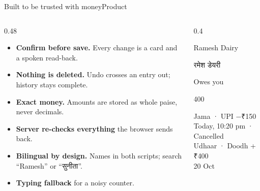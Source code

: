 \documentclass[aspectratio=169,10pt]{beamer}
\newcommand{\rs}{{\deva ₹}}
\newcommand{\lbl}[1]{{\color{muted}\footnotesize #1}}
\begin{document}
\begin{frame}{Built to be trusted with money}{Product}
  \begin{columns}[T]
    \begin{column}{0.48\textwidth}
      \begin{itemize}\setlength{\itemsep}{3pt}\small
        \item \textbf{Confirm before save.} Every change is a card and a spoken read-back.
        \item \textbf{Nothing is deleted.} Undo crosses an entry out; history stays complete.
        \item \textbf{Exact money.} Amounts are stored as whole paise, never decimals.
        \item \textbf{Server re-checks everything} the browser sends back.
        \item \textbf{Bilingual by design.} Names in both scripts; search “Ramesh” or “{\deva सुनीता}”.
        \item \textbf{Typing fallback} for a noisy counter.
      \end{itemize}
    \end{column}
    \begin{column}{0.4\textwidth}
      \begin{appcard}
        {\semibold Ramesh Dairy}\par{\color{muted}\deva रमेश डेयरी}\par\vspace{6pt}
        {\lbl{Owes you}}\par{\semibold\fontsize{24}{26}\selectfont\color{credit}\rs400}
      \end{appcard}
      \vspace{-4pt}
      \begin{appcard}
        \small
        Jama · UPI \hfill {\color{payment}\semibold −\rs150}\\[-1pt]
        {\scriptsize\color{muted} Today, 10:20 pm · Cancelled}\\[3pt]
        Udhaar · Doodh \hfill {\color{credit}\semibold +\rs400}\\[-1pt]
        {\scriptsize\color{muted} 20 Oct}
      \end{appcard}
    \end{column}
  \end{columns}
\end{frame}
\end{document}
